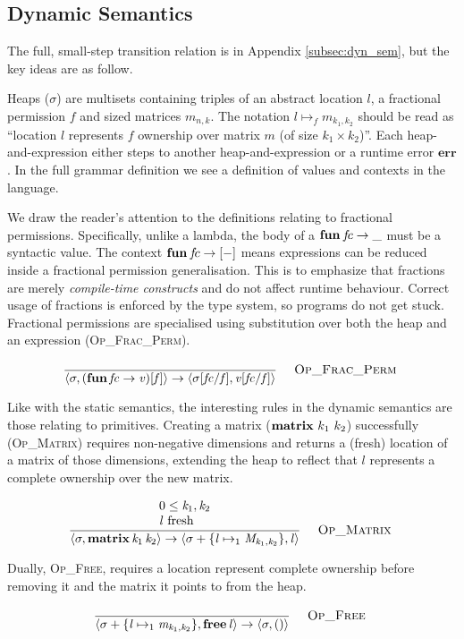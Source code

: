 \subsection{Dynamic Semantics}\label{subsec:semantics}

The full, small-step transition relation is in Appendix \ref{subsec:dyn_sem},
but the key ideas are as follow.

Heaps ($\sigma$) are multisets containing triples of an abstract location $l$,
a fractional permission $f$ and sized matrices $m_{n,k}$. The notation $l
\mapsto_f m_{k_1, k_2}$ should be read as ``location $l$ represents $f$
ownership over matrix $m$ (of size $k_1 \times k_2$)''.  Each heap-and-expression
either steps to another heap-and-expression or a runtime error $\mathbf{err}$.
In the full grammar definition we see a definition of values and contexts in
the language.

We draw the reader's attention to the definitions relating to fractional
permissions. Specifically, unlike a lambda, the body of a $\mathbf{fun}\, f\!c
\rightarrow \_$ must be a syntactic value. The context $\mathbf{fun}\, f\!c
\rightarrow [-]$ means expressions can be reduced inside a fractional
permission generalisation. This is to emphasize that fractions are merely
\emph{compile-time constructs} and do not affect runtime behaviour. Correct
usage of fractions is enforced by the type system, so programs do not get
stuck. Fractional permissions are specialised using substitution over both the
heap and an expression (\textsc{Op\_Frac\_Perm}).

\vspace{-\baselineskip}
\[
    {\displaystyle\frac{\begin{array}{l} \end{array}}{ \langle \sigma , ( \mathbf{fun} \, \mathit{fc} \rightarrow \mathit{v} ) [ \mathit{f} ] \rangle \rightarrow \langle \sigma [ \mathit{fc} / \mathit{f} ] , \mathit{v} [ \mathit{fc} / \mathit{f} ] \rangle}\quad\textsc{ {\textsc{Op\_Frac\_Perm}}{} }}
\]

Like with the static semantics, the interesting rules in the dynamic semantics
are those relating to primitives. Creating a matrix ($\mathbf{matrix}\ k_1\
k_2$) successfully (\textsc{Op\_Matrix}) requires non-negative dimensions and
returns a (fresh) location of a matrix of those dimensions, extending the heap
to reflect that $l$ represents a complete ownership over the new matrix.

\vspace{-\baselineskip}
\[
    {\displaystyle\frac{\begin{array}{l}  0 \leq \mathit{k_{{\mathrm{1}}}} , \mathit{k_{{\mathrm{2}}}}  \\  \mathit{l} \textrm{ fresh }  \\ \end{array}}{ \langle \sigma , \mathbf{matrix} \, \mathit{k_{{\mathrm{1}}}} \, \mathit{k_{{\mathrm{2}}}} \rangle \rightarrow \langle \sigma + \{ \mathit{l} \mapsto _ 1 \mathit{M} _{ \mathit{k_{{\mathrm{1}}}} , \mathit{k_{{\mathrm{2}}}} } \} , \mathit{l} \rangle}\quad\textsc{ {\textsc{Op\_Matrix}}{} }}
\]

Dually, \textsc{Op\_Free}, requires a location represent complete ownership
before removing it and the matrix it points to from the heap.

\vspace{-\baselineskip}
\[
    {\displaystyle\frac{\begin{array}{l} \end{array}}{ \langle \sigma + \{ \mathit{l} \mapsto _ 1 \mathit{m} _{ \mathit{k_{{\mathrm{1}}}} , \mathit{k_{{\mathrm{2}}}} } \} , \mathbf{free} \, \mathit{l} \rangle \rightarrow \langle \sigma , ( ) \rangle}\quad\textsc{ {\textsc{Op\_Free}}{} }}
\]

